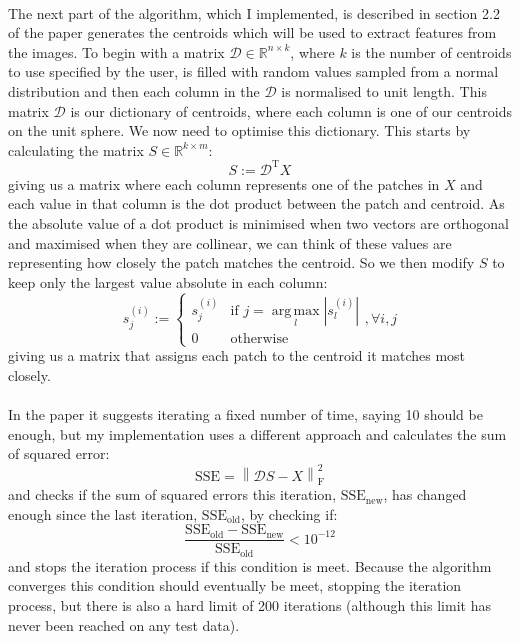 \documentclass{article}
\DeclareMathOperator*{\argmax}{arg\,max}
\begin{document}
\paragraph*{}

The next part of the algorithm, which I implemented, is described in section 2.2 of the paper generates the centroids which will be used to extract features from the images. To begin with a matrix $\mathcal{D} \in \mathbb{R}^{n \times k}$, where $k$ is the number of centroids to use specified by the user, is filled with random values sampled from a normal distribution and then each column in the $\mathcal{D}$ is normalised to unit length. This matrix $\mathcal{D}$ is our dictionary of centroids, where each column is one of our centroids on the unit sphere. We now need to optimise this dictionary. This starts by calculating the matrix $S \in \mathbb{R}^{k \times m}$:
\[
S := \mathcal{D}^{\mathrm{T}} X
\]
giving us a matrix where each column represents one of the patches in $X$ and each value in that column is the dot product between the patch and centroid. As the absolute value of a dot product is minimised when two vectors are orthogonal and maximised when they are collinear, we can think of these values are representing how closely the patch matches the centroid. So we then modify $S$ to keep only the largest value absolute in each column:
\[
s^{(i)}_{j} := 
\begin{cases}
s^{(i)}_j & \textrm{if } j = \argmax\limits_{l} \left| s^{(i)}_l \right| \\
0 & \textrm{otherwise}
\end{cases}
, \forall i,j
\]
giving us a matrix that assigns each patch to the centroid it matches most closely.

\paragraph*{}

In the paper it suggests iterating a fixed number of time, saying 10 should be enough, but my implementation uses a different approach and calculates the sum of squared error:
\[
\mathrm{SSE} = \left\lVert \mathcal{D}S - X \right\rVert_{\mathrm{F}}^{2}
\]
and checks if the sum of squared errors this iteration, $\mathrm{SSE_{new}}$, has changed enough since the last iteration, $\mathrm{SSE_{old}}$, by checking if:
\[
\frac{\mathrm{SSE_{old}} - \mathrm{SSE_{new}}}{\mathrm{SSE_{old}}} < 10^{-12}
\]
and stops the iteration process if this condition is meet. Because the algorithm converges this condition should eventually be meet, stopping the iteration process, but there is also a hard limit of 200 iterations (although this limit has never been reached on any test data).
\end{document}
